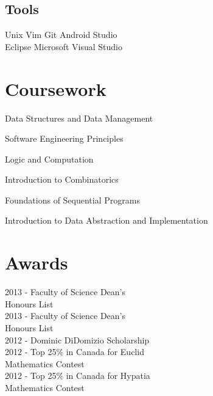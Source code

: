 \documentclass[letterpaper]{deedy-resume}
\begin{document}
\begin{minipage}[t]{0.33\textwidth}
\subsection{Tools}

Unix \textbullet{} Vim \textbullet{} Git \textbullet{} Android Studio\\
Eclipse \textbullet{} Microsoft Visual Studio
\sectionspace

\section{Coursework}
\vspace{\topsep}
\begin{tightitemize}
\item Data Structures and Data Management
\item Software Engineering Principles
\item Logic and Computation
\item Introduction to Combinatorics
\item Foundations of Sequential Programs
\item Introduction to Data Abstraction and Implementation
\end{tightitemize}
\sectionspace

\section{Awards}
2013 - Faculty of Science Dean's\\
\hspace{1.05cm}Honours List\\
2013 - Faculty of Science Dean's\\
\hspace{1.05cm}Honours List\\
2012 - Dominic DiDomizio Scholarship\\
2012 - Top 25\% in Canada for Euclid\\
\hspace{1.05cm}Mathematics Contest\\
2012 - Top 25\% in Canada for Hypatia\\
\hspace{1.05cm}Mathematics Contest
\sectionspace

\end{minipage} %
\hfill
%
\end{document}
